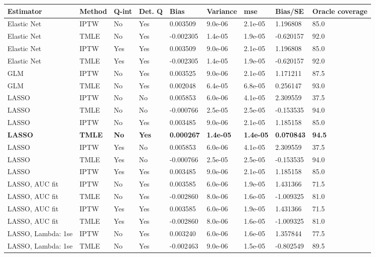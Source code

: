 
\begin{longtable}[l]{lllllllll}
\toprule
Estimator & Method & Q-int & Det. Q & Bias & Variance & mse & Bias/SE & Oracle coverage\\
\midrule
Elastic Net & IPTW & No & Yes & 0.003509 & 9.0e-06 & 2.1e-05 & 1.196808 & 85.0\\
Elastic Net & TMLE & No & Yes & -0.002305 & 1.4e-05 & 1.9e-05 & -0.620157 & 92.0\\
Elastic Net & IPTW & Yes & Yes & 0.003509 & 9.0e-06 & 2.1e-05 & 1.196808 & 85.0\\
Elastic Net & TMLE & Yes & Yes & -0.002305 & 1.4e-05 & 1.9e-05 & -0.620157 & 92.0\\
GLM & IPTW & No & Yes & 0.003525 & 9.0e-06 & 2.1e-05 & 1.171211 & 87.5\\
GLM & TMLE & No & Yes & 0.002048 & 6.4e-05 & 6.8e-05 & 0.256147 & 93.0\\
LASSO & IPTW & No & No & 0.005853 & 6.0e-06 & 4.1e-05 & 2.309559 & 37.5\\
LASSO & TMLE & No & No & -0.000766 & 2.5e-05 & 2.5e-05 & -0.153535 & 94.0\\
LASSO & IPTW & No & Yes & 0.003485 & 9.0e-06 & 2.1e-05 & 1.185158 & 85.0\\
\midrule
\textbf{LASSO} & \textbf{TMLE} & \textbf{No} & \textbf{Yes} & \textbf{0.000267} & \textbf{1.4e-05} & \textbf{1.4e-05} & \textbf{0.070843} & \textbf{94.5}\\
\midrule
LASSO & IPTW & Yes & No & 0.005853 & 6.0e-06 & 4.1e-05 & 2.309559 & 37.5\\
LASSO & TMLE & Yes & No & -0.000766 & 2.5e-05 & 2.5e-05 & -0.153535 & 94.0\\
LASSO & IPTW & Yes & Yes & 0.003485 & 9.0e-06 & 2.1e-05 & 1.185158 & 85.0\\
LASSO, AUC fit & IPTW & No & Yes & 0.003585 & 6.0e-06 & 1.9e-05 & 1.431366 & 71.5\\
LASSO, AUC fit & TMLE & No & Yes & -0.002860 & 8.0e-06 & 1.6e-05 & -1.009325 & 81.0\\
LASSO, AUC fit & IPTW & Yes & Yes & 0.003585 & 6.0e-06 & 1.9e-05 & 1.431366 & 71.5\\
LASSO, AUC fit & TMLE & Yes & Yes & -0.002860 & 8.0e-06 & 1.6e-05 & -1.009325 & 81.0\\
LASSO, Lambda: 1se & IPTW & No & Yes & 0.003240 & 6.0e-06 & 1.6e-05 & 1.357844 & 77.5\\
LASSO, Lambda: 1se & TMLE & No & Yes & -0.002463 & 9.0e-06 & 1.5e-05 & -0.802549 & 89.5\\

\end{longtable}

